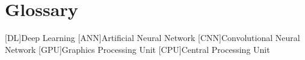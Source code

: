 \chapter{Glossary}

\footnotesize
\SingleSpacing

\begin{multicols}{2}
\begin{acronym}[AAAAAA]

	[DL]{Deep Learning}
	[ANN]{Artificial Neural Network}
	[CNN]{Convolutional Neural Network}
	[GPU]{Graphics Processing Unit}
	[CPU]{Central Processing Unit}

\end{acronym}
\end{multicols}

